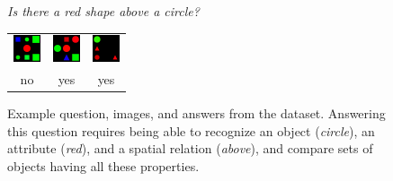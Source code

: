 \documentclass[10pt,twocolumn,letterpaper]{article}
\begin{document}
\begin{figure}
  \centering
  \emph{Is there a red shape above a circle?} \\[1em]
  \begin{tabular}{ccc}
    \includegraphics[width=0.25\columnwidth]{fig/shapes1} &
    \includegraphics[width=0.25\columnwidth]{fig/shapes2} &
    \includegraphics[width=0.25\columnwidth]{fig/shapes3} \\
    no & yes & yes
  \end{tabular}
  \caption{Example question, images, and answers from the \shapes dataset.
    Answering this question requires being able to recognize an object
    (\emph{circle}), an attribute (\emph{red}), and a spatial relation
    (\emph{above}), and compare sets of objects having all these properties.}
\end{figure}
\end{document}
